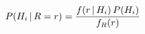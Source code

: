 \documentclass[preview]{standalone}
\begin{document}
\begin{align*}
\special{dvisvgm:raw <g id='unique000'>}P(H_i\,|\,R=r) = \frac{f(r\,|\,H_i)\,P(H_i)}{f_R(r)}\special{dvisvgm:raw </g>}
\end{align*}
\end{document}
